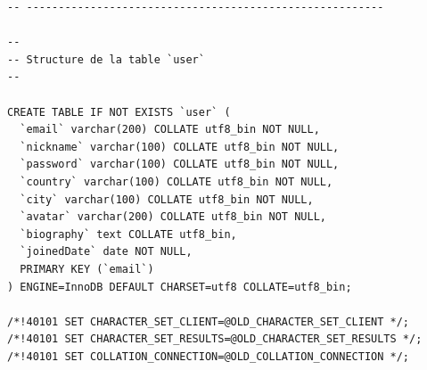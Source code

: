 \documentclass[a4paper,10pt]{article}
\begin{document}
\begin{lstlisting}
-- --------------------------------------------------------

--
-- Structure de la table `user`
--

CREATE TABLE IF NOT EXISTS `user` (
  `email` varchar(200) COLLATE utf8_bin NOT NULL,
  `nickname` varchar(100) COLLATE utf8_bin NOT NULL,
  `password` varchar(100) COLLATE utf8_bin NOT NULL,
  `country` varchar(100) COLLATE utf8_bin NOT NULL,
  `city` varchar(100) COLLATE utf8_bin NOT NULL,
  `avatar` varchar(200) COLLATE utf8_bin NOT NULL,
  `biography` text COLLATE utf8_bin,
  `joinedDate` date NOT NULL,
  PRIMARY KEY (`email`)
) ENGINE=InnoDB DEFAULT CHARSET=utf8 COLLATE=utf8_bin;

/*!40101 SET CHARACTER_SET_CLIENT=@OLD_CHARACTER_SET_CLIENT */;
/*!40101 SET CHARACTER_SET_RESULTS=@OLD_CHARACTER_SET_RESULTS */;
/*!40101 SET COLLATION_CONNECTION=@OLD_COLLATION_CONNECTION */;

\end{lstlisting}
\end{document}
